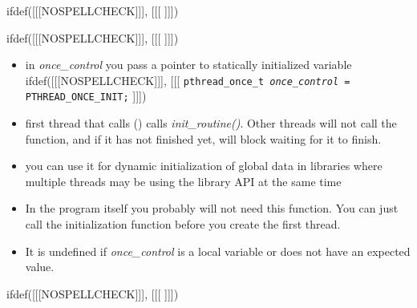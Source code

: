
ifdef([[[NOSPELLCHECK]]], [[[
]]])

\begin{slide}
ifdef([[[NOSPELLCHECK]]], [[[
]]])
\begin{itemize}
\item in \emph{once\_control} you pass a pointer to statically initialized
variable \\
ifdef([[[NOSPELLCHECK]]], [[[
\texttt{pthread\_once\_t \emph{once\_control} = PTHREAD\_ONCE\_INIT;}
]]])
\item first thread that calls () calls
\emph{init\_routine()}.  Other threads will not call the function, and if it has
not finished yet, will block waiting for it to finish.
\item you can use it for dynamic initialization of global data in libraries
where multiple threads may be using the library API at the same time
\end{itemize}
\end{slide}

\begin{itemize}
\item In the program itself you probably will not need this function.  You can
just call the initialization function before you create the first thread.
\item It is undefined if \emph{once\_control} is a local variable or does not
have an expected value.
\end{itemize}


ifdef([[[NOSPELLCHECK]]], [[[
]]])

